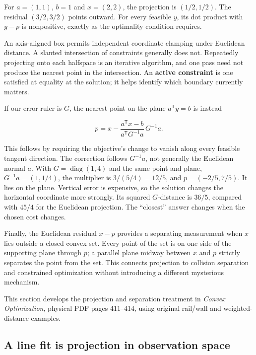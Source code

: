 For \(a=(1,1)\), \(b=1\) and \(x=(2,2)\), the projection is \((1/2,1/2)\). The residual \((3/2,3/2)\) points outward. For every feasible \(y\), its dot product with \(y-p\) is nonpositive, exactly as the optimality condition requires.

An axis-aligned box permits independent coordinate clamping under Euclidean distance. A slanted intersection of constraints generally does not. Repeatedly projecting onto each halfspace is an iterative algorithm, and one pass need not produce the nearest point in the intersection. An \textbf{active constraint} is one satisfied at equality at the solution; it helps identify which boundary currently matters.

If our error ruler is \(G\), the nearest point on the plane \(a^{\mathsf T}y=b\) is instead

\[
p=x-\frac{a^{\mathsf T}x-b}{a^{\mathsf T}G^{-1}a}\,G^{-1}a.
\]

This follows by requiring the objective's change to vanish along every feasible tangent direction. The correction follows \(G^{-1}a\), not generally the Euclidean normal \(a\). With \(G=\operatorname{diag}(1,4)\) and the same point and plane, \(G^{-1}a=(1,1/4)\), the multiplier is \(3/(5/4)=12/5\), and \(p=(-2/5,7/5)\). It lies on the plane. Vertical error is expensive, so the solution changes the horizontal coordinate more strongly. Its squared \(G\)-distance is \(36/5\), compared with \(45/4\) for the Euclidean projection. The ``closest'' answer changes when the chosen cost changes.

Finally, the Euclidean residual \(x-p\) provides a separating measurement when \(x\) lies outside a closed convex set. Every point of the set is on one side of the supporting plane through \(p\); a parallel plane midway between \(x\) and \(p\) strictly separates the point from the set. This connects projection to collision separation and constrained optimization without introducing a different mysterious mechanism.

This section develops the projection and separation treatment in \emph{Convex Optimization}, physical PDF pages 411--414, using original rail/wall and weighted-distance examples.

\subsection{A line fit is projection in observation space}\label{01-foundations-i-ch017-a-line-fit-is-projection-in-observation-space}

